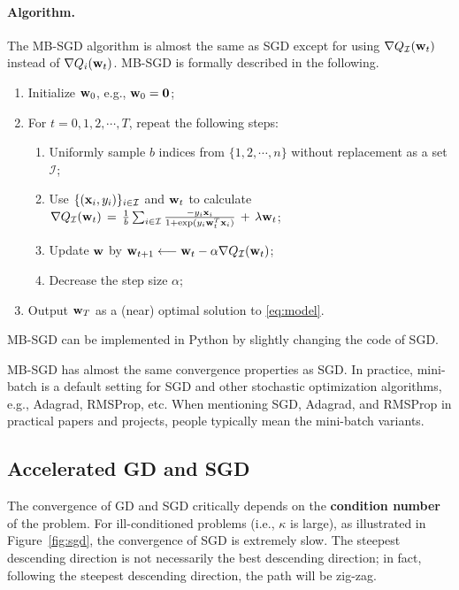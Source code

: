 \documentclass[11pt]{article}
\numberwithin{equation}{section}
\def\w{{\bf w}}
\def\x{{\bf x}}
\def\0{{\bf 0}}
\def\IM{{\mathcal I}}
\begin{document}
\paragraph{Algorithm.}
The MB-SGD algorithm is almost the same as SGD except for using $\nabla Q_{\IM} (\w_t)$ instead of $\nabla Q_i (\w_t)$.
MB-SGD is formally described in the following.
\begin{enumerate}
	\item 
	Initialize $\w_0$, e.g., $\w_0 = \0$;
	\item
	For $t = 0, 1, 2, \cdots , T$, repeat the following steps:
	\begin{enumerate}
		\item
		Uniformly sample $b$ indices from $\{ 1 , 2, \cdots , n \}$ without replacement as a set $\IM$;
		\item 
		Use $\{ (\x_i, y_i) \}_{i \in \IM}$ and $\w_t$ to calculate
		$\nabla Q_{\IM} (\w_t) \, = \, \frac{1}{b} \sum_{i \in \IM} \frac{-  y_i \x_i }{1+\exp({y_i \w_t^T \x_i})} \, + \, \lambda \w_t $;
		\item
		Update $\w$ by
		$\w_{t+1} \longleftarrow \w_t - \alpha \nabla Q_{\IM} (\w_t)$;
		\item
		Decrease the step size $\alpha$;
	\end{enumerate}
	\item
	Output $\w_{T}$ as a (near) optimal solution to \eqref{eq:model}.
\end{enumerate}
MB-SGD can be implemented in Python by slightly changing the code of SGD.




MB-SGD has almost the same convergence properties as SGD.
In practice, mini-batch is a default setting for SGD and other stochastic optimization algorithms, e.g., Adagrad, RMSProp, etc.
When mentioning SGD, Adagrad, and RMSProp in practical papers and projects, people typically mean the mini-batch variants.




\subsection{Accelerated GD and SGD}

The convergence of GD and SGD critically depends on the {\bf condition number} of the problem.
For ill-conditioned problems (i.e., $\kappa$ is large), as illustrated in Figure~\ref{fig:sgd},
the convergence of SGD is extremely slow.
The steepest descending direction is not necessarily the best descending direction;
in fact, following the steepest descending direction, the path will be zig-zag.
\end{document}
